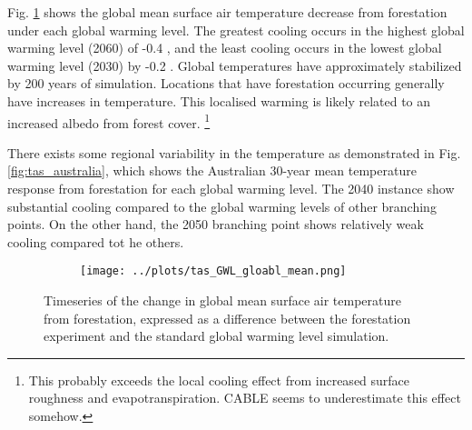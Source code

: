\documentclass[]{article}
\begin{document}
Fig. \ref{fig:global_temperature_timeseries} shows the global mean surface air temperature decrease from forestation under each global warming level.
The greatest cooling occurs in the highest global warming level (2060) of -0.4 \textcelsius, and the least cooling occurs in the lowest global warming level (2030) by -0.2 \textcelsius{}.
Global temperatures have approximately stabilized by 200 years of simulation.
Locations that have forestation occurring generally have increases in temperature.
This localised warming is likely related to an increased albedo from forest cover.
\footnote{This probably exceeds the local cooling effect from increased surface roughness and evapotranspiration. CABLE seems to underestimate this effect somehow.}

There exists some regional variability in the temperature as demonstrated in Fig. \ref{fig:tas_australia}, which shows the Australian 30-year mean temperature response from forestation for each global warming level.
The 2040 instance show substantial cooling compared to the global warming levels of other branching points.
On the other hand, the 2050 branching point shows relatively weak cooling compared tot he others.

%

\begin{figure}[H]
    \centering
    \begin{subfigure}[b]{\linewidth}
        \texttt{[image: ../plots/tas\_GWL\_gloabl\_mean.png]}
    \end{subfigure}
    \caption{Timeseries of the change in global mean surface air temperature from forestation, expressed as a difference between the forestation experiment and the standard global warming level simulation.}
    \label{fig:global_temperature_timeseries}
\end{figure}
\end{document}
